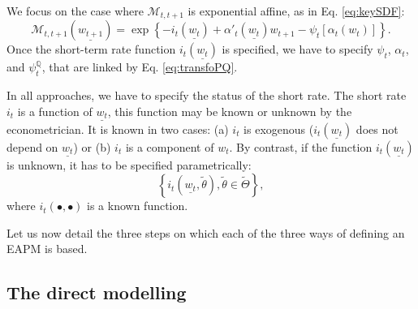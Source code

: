 \documentclass[
  12pt,
]{book}
\theoremstyle{definition}
\theoremstyle{definition}
\theoremstyle{definition}
\theoremstyle{definition}
\theoremstyle{remark}
\begin{document}
We focus on the case where \(\mathcal{M}_{t,t+1}\) is exponential affine, as in Eq. \eqref{eq:keySDF}:
\[
\mathcal{M}_{t,t+1} (\underline{w_{t+1}}) = \exp\left\{ -i_{t} (\underline{w_t}) + \alpha'_t(\underline{w_t})w_{t+1} - \psi_t [\alpha_t (w_t)]\right\}.
\]
Once the short-term rate function \(i_{t}(\underline{w_t})\) is specified, we have to specify \(\psi_t\), \(\alpha_t\), and \(\psi^{\mathbb{Q}}_t\), that are linked by Eq. \eqref{eq:transfoPQ}.

In all approaches, we have to specify the status of the short rate. The short rate \(i_{t}\) is a function of \(\underline{w_t}\), this function may be known or unknown by the econometrician. It is known in two cases: (a) \(i_{t}\) is exogenous (\(i_{t}(\underline{w_t})\) does not depend on \(\underline{w_t}\)) or (b) \(i_{t}\) is a component of \(w_t\). By contrast, if the function \(i_{t} (\underline{w_t})\) is unknown, it has to be specified parametrically:
\[
\left\{ i_{t} (\underline{w_t}, \tilde{\theta}), \tilde{\theta}\in \tilde{\Theta} \right\},
\]
where \(i_{t}(\bullet,\bullet)\) is a known function.

Let us now detail the three steps on which each of the three ways of defining an EAPM is based.

\hypertarget{DirectModeling}{%
\subsection{The direct modelling}\label{DirectModeling}}
\end{document}
